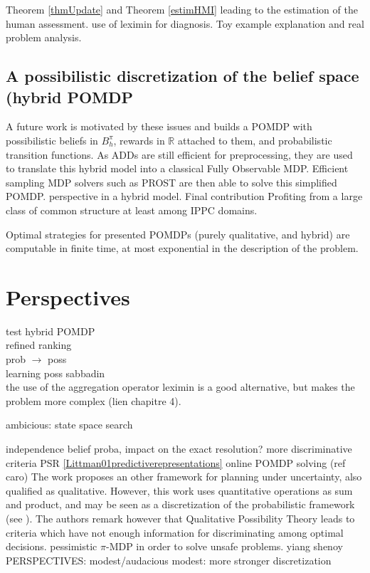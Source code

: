 Theorem \ref{thmUpdate} and Theorem \ref{estimHMI}
leading to the estimation of the human assessment.
use of leximin for diagnosis.
Toy example explanation and real problem analysis.

\subsection*{A possibilistic discretization of the belief space (hybrid POMDP}

A future work is motivated by these issues
and builds a POMDP with possibilistic beliefs in $B_h^{\pi}$,
rewards in $\mathbb{R}$ attached to them,
and probabilistic transition functions.
As ADDs are still efficient for preprocessing,
they are used to translate this hybrid
model into a classical Fully Observable MDP.
Efficient sampling MDP solvers such as PROST 
are then able to solve this simplified POMDP. 
perspective in a hybrid model.
Final contribution Profiting from a large class of common structure
at least among IPPC domains.


Optimal strategies for presented POMDPs (purely qualitative, and hybrid)
are computable in finite time, at most exponential in the description of the problem.


\section*{Perspectives}
test hybrid POMDP\\
refined ranking\\
prob $\rightarrow$ poss\\
learning poss sabbadin\\
the use of the aggregation operator leximin 
is a good alternative,
but makes the problem more complex (lien chapitre 4).

ambicious: state space search

independence belief proba, impact on the exact resolution?
\cite{LIP61723} more discriminative criteria
PSR \ref{Littman01predictiverepresentations}
online POMDP solving (ref caro)
The work \cite{Bonet:2002:QMP:2073876.2073884} proposes an other framework
for planning under uncertainty, also qualified as qualitative. 
However, this work uses quantitative operations
as sum and product, and may be seen as a discretization of the probabilistic framework
(see \cite{Wilson:1995:OMC:2074158.2074221}).
The authors remark however that Qualitative Possibility Theory leads to 
criteria which have not enough information for discriminating
among optimal decisions.
pessimistic $\pi$-MDP in order to solve unsafe problems. yiang shenoy
PERSPECTIVES: modest/audacious
modest: more stronger discretization






